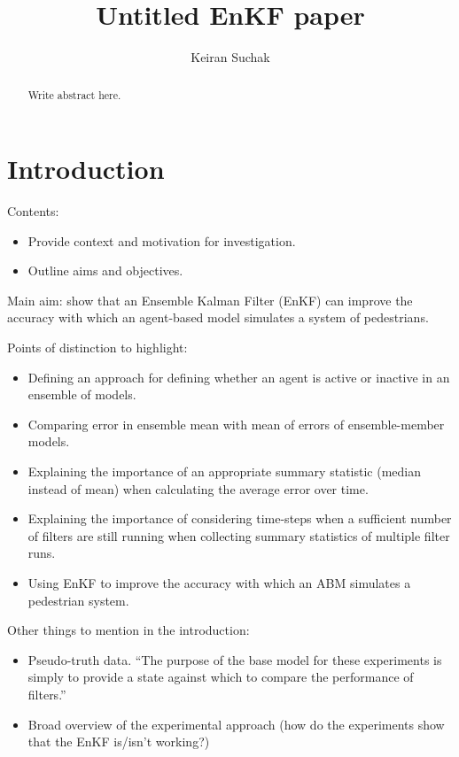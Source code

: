 \documentclass{article}
\title{Untitled EnKF paper}
\author{Keiran Suchak}
\begin{document}
\maketitle{}

\begin{abstract}
    Write abstract here.
\end{abstract}

\section{Introduction}\label{sec:intro}

Contents:
\begin{itemize}
    \item Provide context and motivation for investigation.
    \item Outline aims and objectives.
\end{itemize}

Main aim: show that an Ensemble Kalman Filter (EnKF) can improve the accuracy with which an agent-based model simulates a system of pedestrians.

Points of distinction to highlight:
\begin{itemize}
    \item Defining an approach for defining whether an agent is active or
        inactive in an ensemble of models.
    \item Comparing error in ensemble mean with mean of errors of
        ensemble-member models.
    \item Explaining the importance of an appropriate summary statistic
        (median instead of mean) when calculating the average error over
        time.
    \item Explaining the importance of considering time-steps when a
        sufficient number of filters are still running when collecting
        summary statistics of multiple filter runs.
    \item Using EnKF to improve the accuracy with which an ABM simulates a
        pedestrian system.
\end{itemize}

Other things to mention in the introduction:
\begin{itemize}
  \item Pseudo-truth data. ``The purpose of the base model for these experiments is simply to provide a state against which to compare the performance of filters.''
  \item Broad overview of the experimental approach (how do the experiments show that the EnKF is/isn't working?)
\end{itemize}
\end{document}
